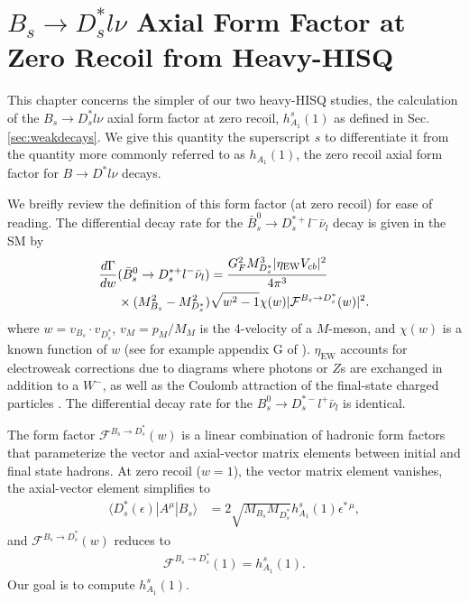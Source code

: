 ﻿\chapter{$B_s\to D_s^*l\nu$ Axial Form Factor at Zero Recoil from Heavy-HISQ}
\label{chap:BsDsstar}

This chapter concerns the simpler of our two heavy-HISQ studies, the calculation of the $B_s\to D^*_sl\nu$ axial form factor at zero recoil, $h^s_{A_1}(1)$ as defined in Sec. \ref{sec:weakdecays}. We give this quantity the superscript $s$ to differentiate it from the quantity more commonly referred to as $h_{A_1}(1)$, the zero recoil axial form factor for $B\to D^*l\nu$ decays.

We breifly review the definition of this form factor (at zero recoil) for ease of reading. The differential decay rate for the $\bar{B}_s^0\to D_s^{*+} l^- \bar{\nu}_l$ decay is given in the SM by
\begin{align}
  {d \Gamma \over dw} &(\bar{B}_s^0\to D_s^{*+} l^- \bar{\nu}_l) = {G_F^2 M_{D_s^*}^3 | \eta_{\text{EW}} V_{cb} |^2 \over 4\pi^3}
\\  &\times(M_{B_s}^2-M_{D_s^*}^2) \sqrt{w^2-1} \chi(w) | \mathcal{F}^{B_s\to D_s^*}(w) |^2. \nonumber
\end{align}
where $w = v_{B_s} \cdot v_{D^*_s}$, $v_M = p_M/M_M$ is the 4-velocity of a $M$-meson, and $\chi(w)$ is a known function of $w$ (see for example appendix G of \cite{Harrison:2017fmw}). $\eta_{\text{EW}}$ accounts for electroweak corrections due to diagrams where photons or $Z$s are exchanged in addition to a $W^-$, as well as the Coulomb attraction of the final-state charged particles \cite{SIRLIN198283,Ginsberg1968,PhysRevD.41.1736}. The differential decay rate for the $B_s^0\to D_s^{*-} l^+ \bar{\nu}_l$ is identical.

The form factor $\mathcal{F}^{B_s\to D_s^*}(w)$ is a linear combination of hadronic form factors that parameterize the vector and axial-vector matrix elements between initial and final state hadrons. At zero recoil ($w=1$), the vector matrix element vanishes, the axial-vector element simplifies to
\begin{align}
  \langle D^*_s(\epsilon)| A^{\mu} | B_s \rangle &= 2 \sqrt{M_{B_s}M_{D^*_s}} h^s_{A_1}(1) \epsilon^{*\,\mu},
\end{align}
and $\mathcal{F}^{B_s\to D_s^*}(w)$ reduces to
\begin{align}
  \mathcal{F}^{B_s\to D_s^*}(1) = h^s_{A_1}(1).
\end{align}
Our goal is to compute $h^s_{A_1}(1)$.

